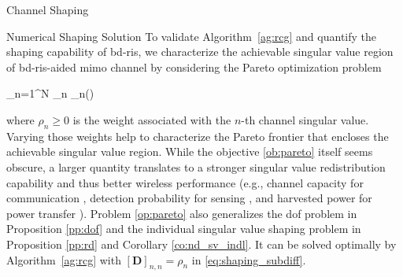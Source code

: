 \documentclass[journal]{IEEEtran}
\begin{document}
\begin{section}{Channel Shaping}
\begin{subsection}{Numerical Shaping Solution}
		To validate Algorithm~\ref{ag:rcg} and quantify the shaping capability of \gls{bd}-\gls{ris}, we characterize the achievable singular value region of \gls{bd}-\gls{ris}-aided \gls{mimo} channel by considering the Pareto optimization problem
		\begin{maxi!}
			{\scriptstyle{\mathbf{\Theta}}}{\sum_{n=1}^N \rho_n \sigma_n()}{\label{op:pareto}}{\label{ob:pareto}}
		\end{maxi!}
		where $\rho_n \ge 0$ is the weight associated with the $n$-th channel singular value.
		Varying those weights help to characterize the Pareto frontier that encloses the achievable singular value region.
		While the objective \eqref{ob:pareto} itself seems obscure, a larger quantity translates to a stronger singular value redistribution capability and thus better wireless performance (e.g., channel capacity for communication \cite{Clerckx2013}, detection probability for sensing \cite{Liu2022c}, and harvested power for power transfer \cite{Shen2021}).
		Problem \eqref{op:pareto} also generalizes the \gls{dof} problem in Proposition \ref{pp:dof} and the individual singular value shaping problem in Proposition \ref{pp:rd} and Corollary \ref{co:nd_sv_indl}.
		It can be solved optimally by Algorithm~\ref{ag:rcg} with $[\mathbf{D}]_{n,n} = \rho_n$ in \eqref{eq:shaping_subdiff}.
	\end{subsection}
\end{section}
\end{document}
